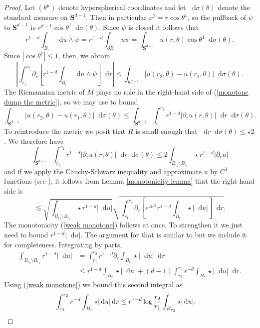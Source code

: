\documentclass[reqno,12pt,letterpaper]{amsart}
\newcommand{\Sph}{\mathbf S}
\newcommand*\dif{\mathop{}\!\mathrm{d}}
\theoremstyle{definition}
\numberwithin{equation}{section}
\begin{document}
\begin{proof}
Let $(\theta^\mu)$ denote hyperspherical coordinates and let $\dif \sigma(\theta)$ denote the standard measure on $\Sph^{d - 1}$.
Then in particular $x^1 = r \cos \theta^1$, so the pullback of $\psi$ to $\Sph^{d - 1}$ is $r^{d - 1} \cos \theta^1 \dif \sigma(\theta)$.
Since $\psi$ is closed it follows that
$$r^{1 - d} \int_{B_r} \dif u \wedge \psi = r^{1 - d} \int_{\partial B_r} u\psi = \int_{\Sph^{d - 1}} u(r, \theta) \cos \theta^1 \dif \sigma(\theta).$$
Since $|\cos \theta^1| \leq 1$, then, we obtain
\begin{equation}\label{monotone dump the metric}
\left|\int_{r_1}^{r_2} \partial_r \left[r^{1 - d}\int_{B_r} \dif u \wedge \psi\right] \dif r\right| \leq \int_{\Sph^{d - 1}} |u(r_2, \theta) - u(r_1, \theta)| \dif \sigma(\theta).
\end{equation}
The Riemannian metric of $M$ plays no role in the right-hand side of (\ref{monotone dump the metric}), so we may use \cite[Lemma 5.3]{Giusti77} to bound
$$\int_{\Sph^{d - 1}} |u(r_2, \theta) - u(r_1, \theta)| \dif \sigma(\theta) \leq \int_{\Sph^{d - 1}} \int_{r_1}^{r_2} r^{1 - d}|\partial_r u(r, \theta)| \dif r \dif\sigma(\theta).$$
To reintroduce the metric we posit that $R$ is small enough that $\dif r \dif \sigma(\theta) \leq \star 2$.
We therefore have
$$\int_{\Sph^{d - 1}} \int_{r_1}^{r_2} r^{1 - d}|\partial_r u(r, \theta)| \dif r \dif\sigma(\theta) \leq 2 \int_{B_{r_2} \setminus B_{r_1}} \star r^{1 - d}|\partial_r u|$$
and if we apply the Cauchy-Schwarz inequality and approximate $u$ by $C^1$ functions (see \cite[pg68]{Giusti77}), it follows from Lemma \ref{monotonicity lemma} that the right-hand side is
$$\lesssim \sqrt{\int_{B_{r_2} \setminus B_{r_1}} \star r^{1 - d} |\dif u|} \sqrt{\int_{r_1}^{r_2} \partial_r \left[e^{Ar^2} r^{1-d}\int_{B_r} \star |\dif u|\right] \dif r}.$$
The monotonicity (\ref{weak monotone}) follows at once. To strengthen it we just need to bound $r^{1 - d} |\dif u|$.
The argument for that is similar to \cite[Lemma 5.11]{Giusti77} but we include it for completeness.
Integrating by parts,
\begin{align*}
\int_{B_{r_2} \setminus B_{r_1}} r^{1 - d} |\dif u| &= \int_{r_1}^{r_2} r^{1 - d} \partial_r \int_{B_r} \star |\dif u| \dif r \\
&\leq r^{1 - d} \int_{B_r} \star |\dif u| + (d - 1) \int_{r_1}^{r_2} r^{-d} \int_{B_r} \star |\dif u| \dif r.
\end{align*}
Using (\ref{weak monotone}) we bound this second integral as
\begin{align*}
\int_{r_1}^{r_2} r^{-d} \int_{B_r} \star |\dif u| \dif r &\leq r^{1 - d} \log \frac{r_2}{r_1} \int_{B_{r_2}} \star |\dif u|. \qedhere
\end{align*}
\end{proof}
\end{document}
